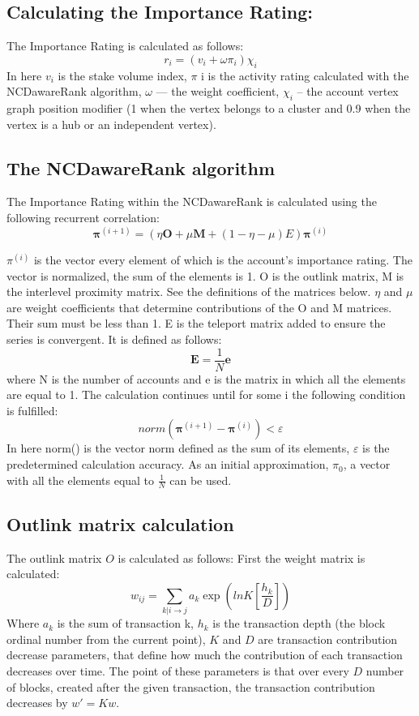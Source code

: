 \documentclass[a4paper,12pt]{article}
\begin{document}
\subsection{Calculating the Importance Rating:}
The Importance Rating is calculated as follows:
$$
r_i = (v_i + \omega \pi_i) \chi_i
$$
In here $v_i$ is the stake volume index, $\pi$ i is the activity rating calculated with the
NCDawareRank algorithm, $\omega$ — the weight coefficient, $\chi_i$ – the account vertex graph
position modifier (1 when the vertex belongs to a cluster and 0.9 when the vertex is a hub or
an independent vertex).

\subsection{The NCDawareRank algorithm}
The Importance Rating within the NCDawareRank is calculated using the following recurrent
correlation:
$$
\boldsymbol{\pi}^{(i+1)} = ( \eta \boldsymbol{O} + \mu \boldsymbol{M} + ( 1 - \eta - \mu ) E ) \boldsymbol{\pi}^{(i)}
$$

$\pi^{(i)}$ is the vector every element of which is the account’s importance rating. The vector is
normalized, the sum of the elements is 1. O is the outlink matrix, M is the interlevel proximity
matrix. See the definitions of the matrices below. $\eta$ and $\mu$ are weight coefficients that
determine contributions of the O and M matrices. Their sum must be less than 1. E is the
teleport matrix added to ensure the series is convergent. It is defined as follows:
$$
\boldsymbol{E}=\frac{1}{N}\boldsymbol{e}
$$
where N is the number of accounts and e is the matrix in which all the elements are equal to
1. The calculation continues until for some i the following condition is fulfilled:
$$
norm(\boldsymbol{\pi}^{(i+1)}-\boldsymbol{\pi}^{(i)})<\varepsilon
$$
In here norm() is the vector norm defined as the sum of its elements,
$\varepsilon$ is the predetermined calculation accuracy. As an initial approximation, $\pi_0$, a vector with
all the elements equal to $\frac{1}{N}$ can be used.


\subsection{Outlink matrix calculation}
The outlink matrix $O$ is calculated as follows:
First the weight matrix is calculated:
$$
w_{ij}=\sum_{k|i \to j}a_k \exp{(lnK [\frac{h_k}{D}])}
$$
Where $a_k$ is the sum of transaction k, $h_k$ is the transaction depth (the block ordinal number
from the current point), $K$ and $D$ are transaction contribution decrease parameters, that
define how much the contribution of each transaction decreases over time. The point of
these parameters is that over every $D$ number of blocks, created after the given transaction,
the transaction contribution decreases by $w'=Kw$.
\end{document}
